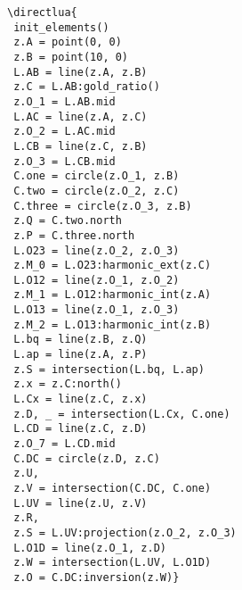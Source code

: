 \begin{minipage}{.42\textwidth}
\begin{verbatim}
\directlua{
 init_elements()
 z.A = point(0, 0)
 z.B = point(10, 0)
 L.AB = line(z.A, z.B)
 z.C = L.AB:gold_ratio()
 z.O_1 = L.AB.mid
 L.AC = line(z.A, z.C)
 z.O_2 = L.AC.mid
 L.CB = line(z.C, z.B)
 z.O_3 = L.CB.mid
 C.one = circle(z.O_1, z.B)
 C.two = circle(z.O_2, z.C)
 C.three = circle(z.O_3, z.B)
 z.Q = C.two.north
 z.P = C.three.north
 L.O23 = line(z.O_2, z.O_3)
 z.M_0 = L.O23:harmonic_ext(z.C)
 L.O12 = line(z.O_1, z.O_2)
 z.M_1 = L.O12:harmonic_int(z.A)
 L.O13 = line(z.O_1, z.O_3)
 z.M_2 = L.O13:harmonic_int(z.B)
 L.bq = line(z.B, z.Q)
 L.ap = line(z.A, z.P)
 z.S = intersection(L.bq, L.ap)
 z.x = z.C:north()
 L.Cx = line(z.C, z.x)
 z.D, _ = intersection(L.Cx, C.one)
 L.CD = line(z.C, z.D)
 z.O_7 = L.CD.mid
 C.DC = circle(z.D, z.C)
 z.U,
 z.V = intersection(C.DC, C.one)
 L.UV = line(z.U, z.V)
 z.R,
 z.S = L.UV:projection(z.O_2, z.O_3)
 L.O1D = line(z.O_1, z.D)
 z.W = intersection(L.UV, L.O1D)
 z.O = C.DC:inversion(z.W)}
\end{verbatim}
\end{minipage}
\begin{minipage}{.58\textwidth}
\begin{center}
\end{center}


\end{minipage}

